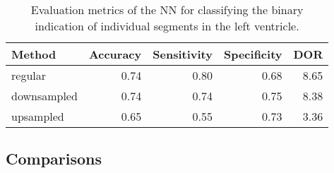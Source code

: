 \begin{table*}[htb]
    \centering
    \begin{tabular}{lrrrr}
        \toprule
        Method      &  Accuracy &  Sensitivity &  Specificity &  DOR \\
        \midrule
        regular     &      0.74 &         0.80 &         0.68 & 8.65 \\
        downsampled &      0.74 &         0.74 &         0.75 & 8.38 \\
        upsampled   &      0.65 &         0.55 &         0.73 & 3.36 \\
        \bottomrule
    \end{tabular}
    \caption{Evaluation metrics of the NN for classifying the binary indication of individual segments in the left ventricle.}
    \label{tab:NN_segm_ind_perf}
\end{table*}

\begin{comment}
[ ] \textbf{Comment on spread of DOR.}
[ ] \textbf{Comment on spread of sensitivity and specificity.}
[ ] \textbf{Comment on common traits in the high performing methods.} Here you can refer to raw performance results in appendix.
[ ] \textbf{Comment on common traits in the low performing methods.} Here you can refer to raw performance results in appendix.
[ ] \textbf{Select one - three methods that are good contendors for being the best method/model in the group and comment on their traits}
\textbf{IF NOT CLUSTERING METHOD}
[ ] \textbf{Make arguments for and against the top three methods in terms of accuracy, sensitivity, specificity, and DOR, and make an informed choice.}
\end{comment}

\subsection{Comparisons}

\begin{comment}
    [ ] 
\end{comment}

